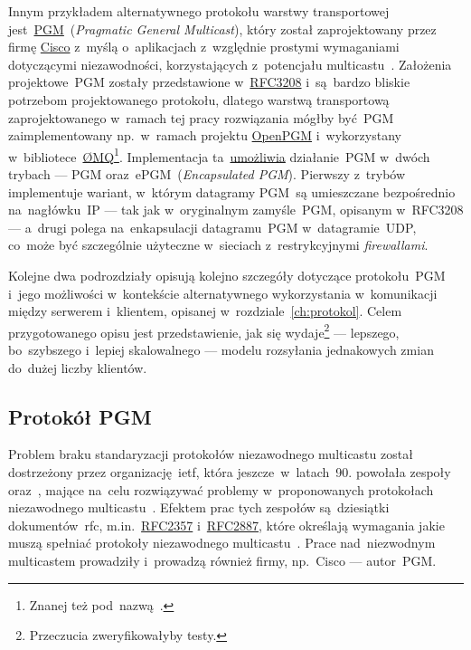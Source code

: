 \documentclass[thesis]{subfiles}
\begin{document}
Innym przykładem alternatywnego protokołu warstwy transportowej jest~\href{https://en.wikipedia.org/wiki/Pragmatic_General_Multicast}{PGM}~(\emph{Pragmatic General Multicast}), który został zaprojektowany przez firmę \href{http://www.cisco.com/}{Cisco} z~myślą o~aplikacjach z~względnie prostymi wymaganiami dotyczącymi niezawodności, korzystających z~potencjału multicastu~\cite{pgm-rfc}. Założenia projektowe~PGM zostały przedstawione w~\href{https://tools.ietf.org/html/rfc3208}{RFC3208} i~są~bardzo bliskie potrzebom projektowanego protokołu, dlatego warstwą transportową zaprojektowanego w~ramach tej pracy rozwiązania mógłby być~PGM zaimplementowany np.~w~ramach projektu \href{https://code.google.com/archive/p/openpgm/}{OpenPGM} i~wykorzystany w~bibliotece~\href{http://zeromq.org/}{ØMQ}\footnote{Znanej też pod~nazwą~.}. Implementacja ta~\href{http://api.zeromq.org/2-1:zmq-pgm}{umożliwia} działanie~PGM w~dwóch trybach --- PGM oraz~ePGM~(\emph{Encapsulated PGM}). Pierwszy z~trybów implementuje wariant, w~którym datagramy PGM~są umieszczane bezpośrednio na~nagłówku~IP --- tak jak w~oryginalnym zamyśle~PGM, opisanym w~RFC3208 --- a~drugi polega na~enkapsulacji datagramu~PGM w~datagramie~UDP, co~może być szczególnie użyteczne w~sieciach z~restrykcyjnymi \emph{firewallami}.

Kolejne dwa podrozdziały opisują kolejno szczegóły dotyczące protokołu~PGM i~jego możliwości w~kontekście alternatywnego wykorzystania w~komunikacji między serwerem i~klientem, opisanej w~rozdziale~\ref{ch:protokol}. Celem przygotowanego opisu jest przedstawienie, jak się wydaje\footnote{Przeczucia zweryfikowałyby testy.} --- lepszego, bo~szybszego i~lepiej skalowalnego --- modelu rozsyłania jednakowych zmian do~dużej liczby klientów.


\subsection{Protokół PGM}
\label{subsec:pgm}

Problem braku standaryzacji protokołów niezawodnego multicastu został dostrzeżony przez organizację~\gls{ietf}, która jeszcze~w~latach~90. powołała zespoły  oraz~, mające na~celu rozwiązywać problemy w~proponowanych protokołach niezawodnego multicastu~\cite{reliable-multicast-journal,reliable-multicast-transport}. Efektem prac tych zespołów są~dziesiątki dokumentów~\gls{rfc}, m.in.~\href{https://tools.ietf.org/html/rfc2357.html}{RFC2357} i~\href{https://tools.ietf.org/html/rfc2887}{RFC2887}, które określają wymagania jakie muszą spełniać protokoły niezawodnego multicastu~\cite{rfc2887,rfc2357}. Prace nad~niezwodnym multicastem prowadziły i~prowadzą również firmy, np.~Cisco --- autor~PGM.
\end{document}
